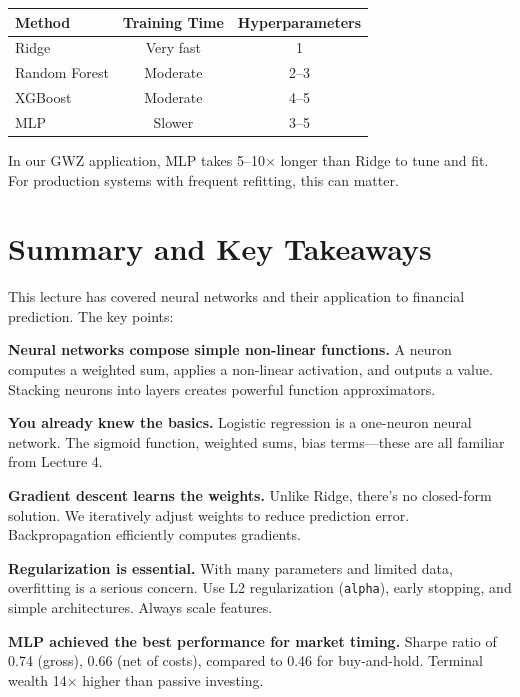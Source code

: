 \documentclass[11pt,a4paper]{article}
\begin{document}
\begin{center}
\begin{tabular}{lcc}
\toprule
\textbf{Method} & \textbf{Training Time} & \textbf{Hyperparameters} \\
\midrule
Ridge & Very fast & 1 \\
Random Forest & Moderate & 2--3 \\
XGBoost & Moderate & 4--5 \\
MLP & Slower & 3--5 \\
\bottomrule
\end{tabular}
\end{center}

In our GWZ application, MLP takes 5--10$\times$ longer than Ridge to tune and fit. For production systems with frequent refitting, this can matter.

\section{Summary and Key Takeaways}

This lecture has covered neural networks and their application to financial prediction. The key points:

\textbf{Neural networks compose simple non-linear functions.} A neuron computes a weighted sum, applies a non-linear activation, and outputs a value. Stacking neurons into layers creates powerful function approximators.

\textbf{You already knew the basics.} Logistic regression is a one-neuron neural network. The sigmoid function, weighted sums, bias terms---these are all familiar from Lecture 4.

\textbf{Gradient descent learns the weights.} Unlike Ridge, there's no closed-form solution. We iteratively adjust weights to reduce prediction error. Backpropagation efficiently computes gradients.

\textbf{Regularization is essential.} With many parameters and limited data, overfitting is a serious concern. Use L2 regularization (\texttt{alpha}), early stopping, and simple architectures. Always scale features.

\textbf{MLP achieved the best performance for market timing.} Sharpe ratio of 0.74 (gross), 0.66 (net of costs), compared to 0.46 for buy-and-hold. Terminal wealth 14$\times$ higher than passive investing.
\end{document}
